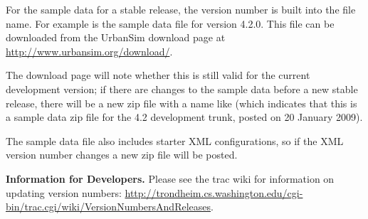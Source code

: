For the sample data for a stable release, the version number is built into
the file name.  For example \mbox{} is the sample data
file for version 4.2.0.  This file can be downloaded from the UrbanSim
download page at \url{http://www.urbansim.org/download/}.

The download page will note whether this is still valid for the current
development version; if there are changes to the sample data before a new
stable release, there will be a new zip file with a name like
 (which indicates that this is a sample
data zip file for the 4.2 development trunk, posted on 20 January 2009).

The sample data file also includes starter XML configurations, so if the
XML version number changes a new zip file will be posted.

{\bf Information for Developers.}  Please see the trac wiki for information
on updating version numbers:
\url{http://trondheim.cs.washington.edu/cgi-bin/trac.cgi/wiki/VersionNumbersAndReleases}.

